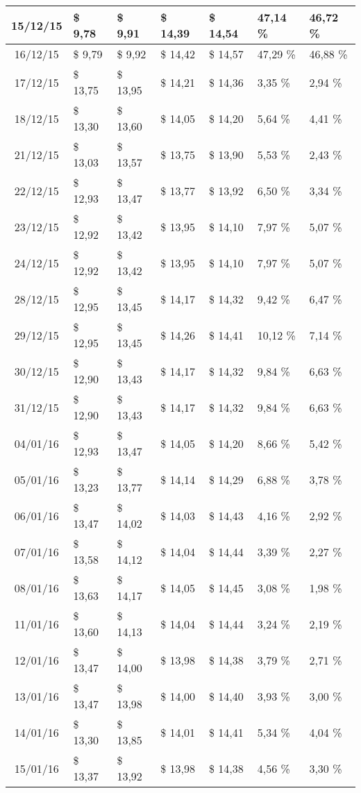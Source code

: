 \begin{center}
\begin{longtable}{|c|p{1.5cm}|p{1.5cm}|p{1.5cm}|p{1.5cm}|p{1.5cm}|p{1.5cm}|}
15/12/15 & \$ 9,78 & \$ 9,91 & \$ 14,39 & \$ 14,54 & 47,14 \% & 46,72 \% \\ \hline
16/12/15 & \$ 9,79 & \$ 9,92 & \$ 14,42 & \$ 14,57 & 47,29 \% & 46,88 \% \\ \hline
17/12/15 & \$ 13,75 & \$ 13,95 & \$ 14,21 & \$ 14,36 & 3,35 \% & 2,94 \% \\ \hline
18/12/15 & \$ 13,30 & \$ 13,60 & \$ 14,05 & \$ 14,20 & 5,64 \% & 4,41 \% \\ \hline
21/12/15 & \$ 13,03 & \$ 13,57 & \$ 13,75 & \$ 13,90 & 5,53 \% & 2,43 \% \\ \hline
22/12/15 & \$ 12,93 & \$ 13,47 & \$ 13,77 & \$ 13,92 & 6,50 \% & 3,34 \% \\ \hline
23/12/15 & \$ 12,92 & \$ 13,42 & \$ 13,95 & \$ 14,10 & 7,97 \% & 5,07 \% \\ \hline
24/12/15 & \$ 12,92 & \$ 13,42 & \$ 13,95 & \$ 14,10 & 7,97 \% & 5,07 \% \\ \hline
28/12/15 & \$ 12,95 & \$ 13,45 & \$ 14,17 & \$ 14,32 & 9,42 \% & 6,47 \% \\ \hline
29/12/15 & \$ 12,95 & \$ 13,45 & \$ 14,26 & \$ 14,41 & 10,12 \% & 7,14 \% \\ \hline
30/12/15 & \$ 12,90 & \$ 13,43 & \$ 14,17 & \$ 14,32 & 9,84 \% & 6,63 \% \\ \hline
31/12/15 & \$ 12,90 & \$ 13,43 & \$ 14,17 & \$ 14,32 & 9,84 \% & 6,63 \% \\ \hline
04/01/16 & \$ 12,93 & \$ 13,47 & \$ 14,05 & \$ 14,20 & 8,66 \% & 5,42 \% \\ \hline
05/01/16 & \$ 13,23 & \$ 13,77 & \$ 14,14 & \$ 14,29 & 6,88 \% & 3,78 \% \\ \hline
06/01/16 & \$ 13,47 & \$ 14,02 & \$ 14,03 & \$ 14,43 & 4,16 \% & 2,92 \% \\ \hline
07/01/16 & \$ 13,58 & \$ 14,12 & \$ 14,04 & \$ 14,44 & 3,39 \% & 2,27 \% \\ \hline
08/01/16 & \$ 13,63 & \$ 14,17 & \$ 14,05 & \$ 14,45 & 3,08 \% & 1,98 \% \\ \hline
11/01/16 & \$ 13,60 & \$ 14,13 & \$ 14,04 & \$ 14,44 & 3,24 \% & 2,19 \% \\ \hline
12/01/16 & \$ 13,47 & \$ 14,00 & \$ 13,98 & \$ 14,38 & 3,79 \% & 2,71 \% \\ \hline
13/01/16 & \$ 13,47 & \$ 13,98 & \$ 14,00 & \$ 14,40 & 3,93 \% & 3,00 \% \\ \hline
14/01/16 & \$ 13,30 & \$ 13,85 & \$ 14,01 & \$ 14,41 & 5,34 \% & 4,04 \% \\ \hline
15/01/16 & \$ 13,37 & \$ 13,92 & \$ 13,98 & \$ 14,38 & 4,56 \% & 3,30 \% \\ \hline

\end{longtable}
\end{center}
